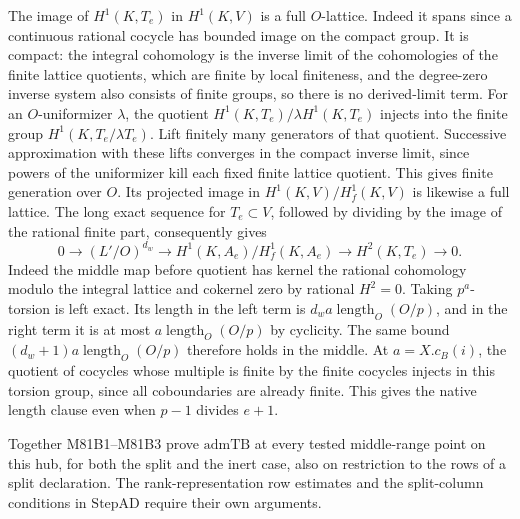 The image of $H^1(K,T_e)$ in $H^1(K,V)$ is a full $O$-lattice.
Indeed it spans since a continuous rational cocycle has bounded
image on the compact group. It is compact: the integral
cohomology is the inverse limit of the cohomologies of the finite
lattice quotients, which are finite by local finiteness, and the
degree-zero inverse system also consists of finite groups, so
there is no derived-limit term. For an $O$-uniformizer $\lambda$,
the quotient $H^1(K,T_e)/\lambda H^1(K,T_e)$ injects into the
finite group $H^1(K,T_e/\lambda T_e)$. Lift finitely many
generators of that quotient. Successive
approximation with these lifts converges in the compact inverse
limit, since powers of the uniformizer kill each fixed finite
lattice quotient. This gives finite generation over $O$.
Its projected image in
$H^1(K,V)/H^1_f(K,V)$ is likewise a full lattice.
The long exact sequence for $T_e\subset V$, followed by dividing
by the image of the rational finite part, consequently gives
\[
 0\longrightarrow (L'/O)^{d_w}\longrightarrow
 H^1(K,A_e)/H_f^1(K,A_e)\longrightarrow H^2(K,T_e)
 \longrightarrow 0 .
\]
Indeed the middle map before quotient has kernel the rational
cohomology modulo the integral lattice and cokernel zero by
rational $H^2=0$. Taking $p^a$-torsion is left exact. Its length
in the left term is $d_wa\operatorname{length}_O(O/p)$,
and in the right term it is at most
$a\operatorname{length}_O(O/p)$ by cyclicity.
The same bound $(d_w+1)a\operatorname{length}_O(O/p)$ therefore
holds in the middle. At $a=X.c_B(i)$, the quotient of cocycles
whose multiple is finite by the finite cocycles injects in
this torsion group, since all coboundaries are already finite.
This gives the native length clause even when $p-1$ divides $e+1$.

Together M81B1--M81B3 prove $\mathrm{admTB}$ at every tested
middle-range point on this hub, for both the split and the inert
case, also on restriction to the rows of a split declaration.
The rank-representation row estimates and the split-column
conditions in $\mathrm{StepAD}$ require their own arguments.
